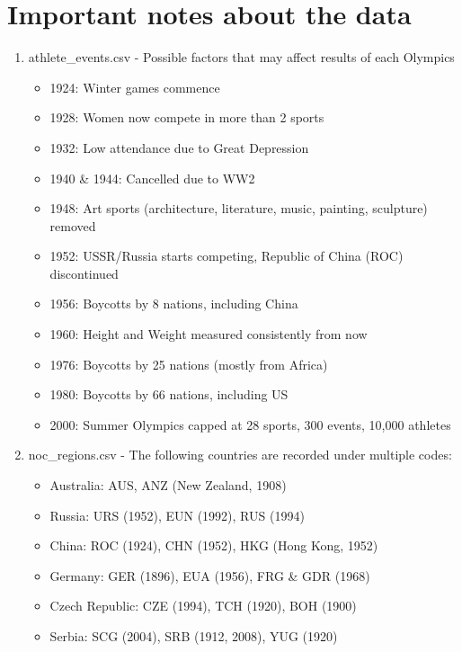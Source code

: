 \documentclass[a4 paper, 12pt]{article}
\begin{document}
\section{Important notes about the data}
    \begin{enumerate}
        \item athlete\_events.csv - Possible factors that may affect results of each Olympics
            \begin{itemize}
                \item 1924: Winter games commence
                \item 1928: Women now compete in more than 2 sports
                \item 1932: Low attendance due to Great Depression
                \item 1940 \& 1944: Cancelled due to WW2
                \item 1948: Art sports (architecture, literature, music, painting, sculpture) removed
                \item 1952: USSR/Russia starts competing, Republic of China (ROC) discontinued
                \item 1956: Boycotts by 8 nations, including China
                \item 1960: Height and Weight measured consistently from now
                \item 1976: Boycotts by 25 nations (mostly from Africa)
                \item 1980: Boycotts by 66 nations, including US
                \item 2000: Summer Olympics capped at 28 sports, 300 events, 10,000 athletes                
            \end{itemize}

        \item noc\_regions.csv - The following countries are recorded under multiple codes:
            
        \begin{itemize}
                \item Australia: AUS, ANZ (New Zealand, 1908)
                \item Russia: URS (1952), EUN (1992), RUS (1994)
                \item China: ROC (1924), CHN (1952), HKG (Hong Kong, 1952)
                \item Germany: GER (1896), EUA (1956), FRG \& GDR (1968)
                \item Czech Republic: CZE (1994), TCH (1920), BOH (1900)
                \item Serbia: SCG (2004), SRB (1912, 2008), YUG (1920)                    
            \end{itemize}  

    \end{enumerate}
\end{document}
